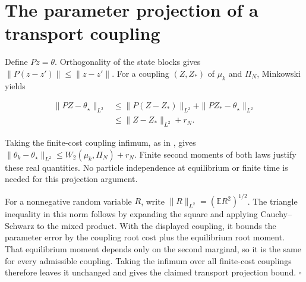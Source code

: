 \documentclass[11pt,a4paper]{article}
\begin{document}
\section{\texorpdfstring{The parameter projection of a transport coupling}{The parameter projection of a transport coupling}}



Define \(Pz=\theta\). Orthogonality of the state blocks gives \(\|P(z-z')\|\le\|z-z'\|\). For a coupling \((Z,Z_*)\) of \(\mu_k\) and \(\Pi_N\), Minkowski yields

\[\begin{aligned}
\|PZ-\theta_\star\|_{L^2}
&\le\|P(Z-Z_*)\|_{L^2}+\|PZ_*-\theta_\star\|_{L^2}\\
&\le\|Z-Z_*\|_{L^2}+r_N.
\end{aligned}\]

Taking the finite-cost coupling infimum, as in \cite[Section~3.48.9]{LangevinLean2026ULASC}, gives \(\|\theta_k-\theta_\star\|_{L^2}\le W_2(\mu_k,\Pi_N)+r_N\). Finite second moments of both laws justify these real quantities. No particle independence at equilibrium or finite time is needed for this projection argument.




For a nonnegative random variable \(R\), write \(\|R\|_{L^2}=(\mathbb ER^2)^{1/2}\). The triangle inequality in this norm follows by expanding the square and applying Cauchy–Schwarz to the mixed product. With the displayed coupling, it bounds the parameter error by the coupling root cost plus the equilibrium root moment. That equilibrium moment depends only on the second marginal, so it is the same for every admissible coupling. Taking the infimum over all finite-cost couplings therefore leaves it unchanged and gives the claimed transport projection bound. \(\square\)
\end{document}
